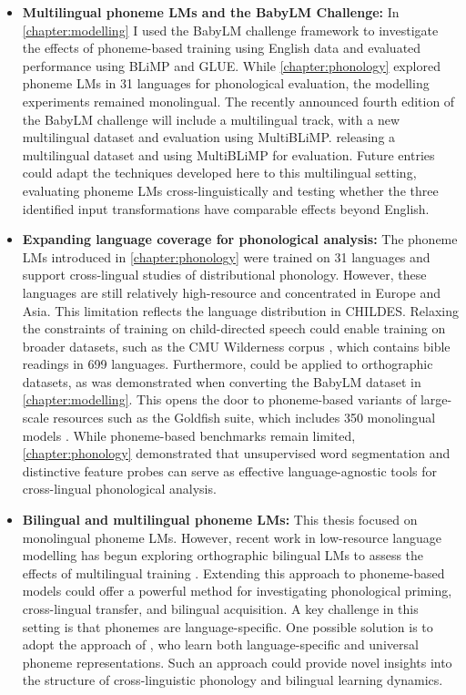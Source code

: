 \begin{itemize}
    \item \textbf{Multilingual phoneme LMs and the BabyLM Challenge:} In \cref{chapter:modelling} I used the BabyLM challenge framework to investigate the effects of phoneme-based training using English data and evaluated performance using BLiMP and GLUE. While \cref{chapter:phonology} explored phoneme LMs in 31 languages for phonological evaluation, the modelling experiments remained monolingual. The recently announced fourth edition of the BabyLM challenge will include a multilingual track, with a new multilingual dataset and evaluation using MultiBLiMP. releasing a multilingual dataset and using MultiBLiMP for evaluation. Future entries could adapt the techniques developed here to this multilingual setting, evaluating phoneme LMs cross-linguistically and testing whether the three identified input transformations have comparable effects beyond English.
    \item \textbf{Expanding language coverage for phonological analysis:} The phoneme LMs introduced in \cref{chapter:phonology} were trained on 31 languages and support cross-lingual studies of distributional phonology. However, these languages are still relatively high-resource and concentrated in Europe and Asia. This limitation reflects the language distribution in CHILDES. Relaxing the constraints of training on child-directed speech could enable training on broader datasets, such as the CMU Wilderness corpus \citep{8683536}, which contains bible readings in 699 languages. Furthermore, \gpp could be applied to orthographic datasets, as was demonstrated when converting the BabyLM dataset in \cref{chapter:modelling}. This opens the door to phoneme-based variants of large-scale resources such as the Goldfish suite, which includes 350 monolingual models \citep{chang2024goldfish}. While phoneme-based benchmarks remain limited, \cref{chapter:phonology} demonstrated that unsupervised word segmentation and distinctive feature probes can serve as effective language-agnostic tools for cross-lingual phonological analysis.
    \item \textbf{Bilingual and multilingual phoneme LMs:} This thesis focused on monolingual phoneme LMs. However, recent work in low-resource language modelling has begun exploring orthographic bilingual LMs to assess the effects of multilingual training \citep{arnett2025acquisition}. Extending this approach to phoneme-based models could offer a powerful method for investigating phonological priming, cross-lingual transfer, and bilingual acquisition. A key challenge in this setting is that phonemes are language-specific. One possible solution is to adopt the approach of \citet{li2020universal}, who learn both language-specific and universal phoneme representations. Such an approach could provide novel insights into the structure of cross-linguistic phonology and bilingual learning dynamics.

\end{itemize}
